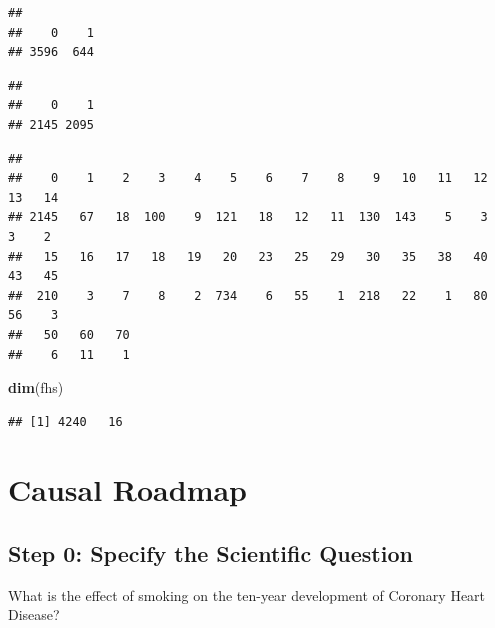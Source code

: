 \documentclass[]{article}
\newenvironment{Shaded}{\begin{snugshade}}{\end{snugshade}}
\newcommand{\KeywordTok}[1]{\textcolor[rgb]{0.13,0.29,0.53}{\textbf{#1}}}
\newcommand{\OperatorTok}[1]{\textcolor[rgb]{0.81,0.36,0.00}{\textbf{#1}}}
\newcommand{\NormalTok}[1]{#1}
\begin{document}
\begin{verbatim}
## 
##    0    1 
## 3596  644
\end{verbatim}

\begin{Shaded}
\end{Shaded}

\begin{verbatim}
## 
##    0    1 
## 2145 2095
\end{verbatim}

\begin{Shaded}
\end{Shaded}

\begin{verbatim}
## 
##    0    1    2    3    4    5    6    7    8    9   10   11   12   13   14 
## 2145   67   18  100    9  121   18   12   11  130  143    5    3    3    2 
##   15   16   17   18   19   20   23   25   29   30   35   38   40   43   45 
##  210    3    7    8    2  734    6   55    1  218   22    1   80   56    3 
##   50   60   70 
##    6   11    1
\end{verbatim}

\begin{Shaded}
\begin{Highlighting}[]
\KeywordTok{dim}\NormalTok{(fhs)}
\end{Highlighting}
\end{Shaded}

\begin{verbatim}
## [1] 4240   16
\end{verbatim}

\section{Causal Roadmap}\label{causal-roadmap}

\subsection{Step 0: Specify the Scientific
Question}\label{step-0-specify-the-scientific-question}

What is the effect of smoking on the ten-year development of Coronary
Heart Disease?
\end{document}
